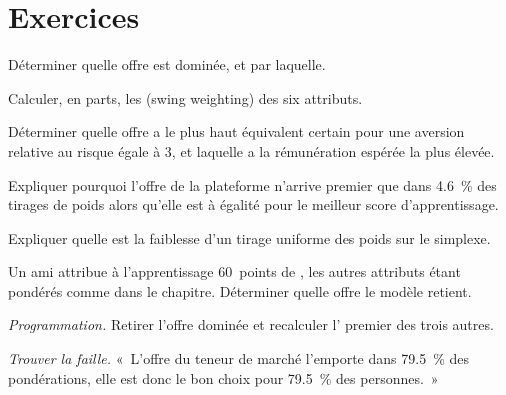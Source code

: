 \section{Exercices}

\begin{exercise}[$\star$]\label{exo:in:choosing:1}
Déterminer quelle offre est dominée, et par laquelle.
\end{exercise}

\begin{exercise}[$\star$]\label{exo:in:choosing:2}
Calculer, en parts, les  (swing weighting) des six attributs.
\end{exercise}

\begin{exercise}[$\star$]\label{exo:in:choosing:3}
Déterminer quelle offre a le plus haut équivalent certain pour une aversion relative au risque égale à 3, et laquelle a la rémunération espérée la plus élevée.
\end{exercise}

\begin{exercise}[$\star\star$]\label{exo:in:choosing:4}
Expliquer pourquoi l'offre de la plateforme n'arrive premier que dans 4.6~\% des tirages de poids alors qu'elle est à égalité pour le meilleur score d'apprentissage.
\end{exercise}

\begin{exercise}[$\star\star$]\label{exo:in:choosing:5}
Expliquer quelle est la faiblesse d'un tirage uniforme des poids sur le simplexe.
\end{exercise}

\begin{exercise}[$\star\star$]\label{exo:in:choosing:6}
Un ami attribue à l'apprentissage 60~points de , les autres attributs étant pondérés comme dans le chapitre. Déterminer quelle offre le modèle retient.
\end{exercise}

\begin{exercise}[$\star\star\star$]\label{exo:in:choosing:7}
\emph{Programmation.} Retirer l'offre dominée et recalculer l' premier des trois autres.
\end{exercise}

\begin{exercise}[$\star\star\star$]\label{exo:in:choosing:8}
\emph{Trouver la faille.} «~L'offre du teneur de marché l'emporte dans 79.5~\% des pondérations, elle est donc le bon choix pour 79.5~\% des
personnes.~»
\end{exercise}

